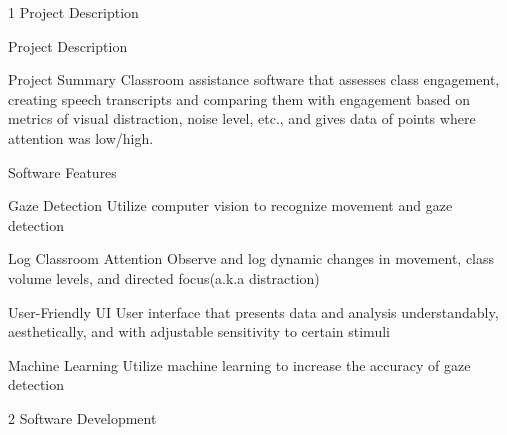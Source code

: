 \documentclass[12pt]{article}
\begin{document}
\begin{flushleft} \large
1   Project Description 
\end{flushleft}
\begin{sectionbox}[colback=white]{Project Description}
\begin{subsectionbox}[colback=white]{Project Summary}
Classroom assistance software that assesses class engagement, creating speech
transcripts and comparing them with engagement based on metrics of visual distraction, noise level, etc., and gives data of points where attention was low/high.
\end{subsectionbox}

\begin{subsectionbox}[colback=white]{Software Features}
\begin{featurebox}[colback=white]{Gaze Detection}
Utilize computer vision to recognize movement and gaze detection
\end{featurebox}
\begin{featurebox}[colback=white]{Log Classroom Attention}
Observe and log dynamic changes in movement, class volume levels, and directed focus(a.k.a distraction)
\end{featurebox}
\begin{featurebox}[colback=white]{User-Friendly UI}
User interface that presents data and analysis understandably, aesthetically, and with adjustable sensitivity to certain stimuli
\end{featurebox}
\begin{featurebox}[colback=white]{Machine Learning}
Utilize machine learning to increase the accuracy of gaze detection
\end{featurebox}
\end{subsectionbox}
\end{sectionbox}
\newpage
\begin{flushleft} \large
2    Software Development
\end{flushleft}
\end{document}
